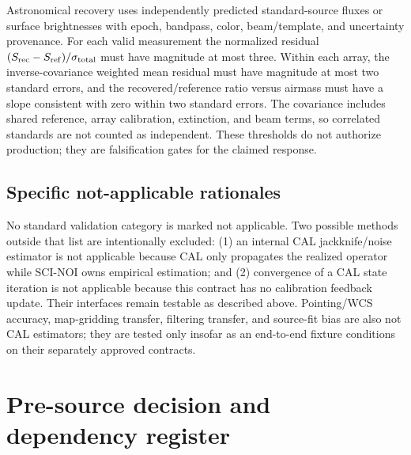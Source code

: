 \documentclass[11pt]{article}
\begin{document}
Astronomical recovery uses independently predicted standard-source fluxes or
surface brightnesses with epoch, bandpass, color, beam/template, and
uncertainty provenance.  For each valid measurement the normalized residual
\((S_{\rm rec}-S_{\rm ref})/\sigma_{\rm total}\) must have magnitude at most
three.  Within each array, the inverse-covariance weighted mean residual must
have magnitude at most two standard errors, and the recovered/reference ratio
versus airmass must have a slope consistent with zero within two standard
errors.  The covariance includes shared reference, array calibration,
extinction, and beam terms, so correlated standards are not counted as
independent.  These thresholds do not authorize production; they are
falsification gates for the claimed response.

\subsection{Specific not-applicable rationales}

No standard validation category is marked not applicable.  Two possible
methods outside that list are intentionally excluded: (1) an internal CAL
jackknife/noise estimator is not applicable because CAL only propagates the
realized operator while SCI-NOI owns empirical estimation; and (2) convergence
of a CAL state iteration is not applicable because this contract has no
calibration feedback update.  Their interfaces remain testable as described
above.  Pointing/WCS accuracy, map-gridding transfer, filtering transfer, and
source-fit bias are also not CAL estimators; they are tested only insofar as an
end-to-end fixture conditions on their separately approved contracts.

\section{Pre-source decision and dependency register}
\end{document}
